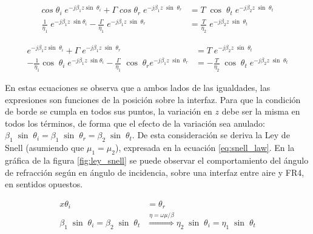 \begin{equation}
	\begin{aligned}
		cos \; \theta_i \; e^{-j \beta_1 z \sin \; \theta_i} + \Gamma \; cos \; \theta_r \; e^{-j \beta_1 z \; \sin\; \theta_r} &= T\; \cos\; \theta_t \; e^{-j \beta_2 z \; \sin\; \theta_t}\\
		\frac{1}{\eta_1} \; e^{-j \beta_1 z \; \sin \theta_i} - \frac{\Gamma}{\eta_1} \; e^{-j \beta_1 z \; \sin \; \theta_r} &= \frac{T}{\eta_2} \; e^{-j \beta_2 z \; \sin\; \theta_t}
	\end{aligned}
	\label{eq:continuidad_campos_paralelo}
\end{equation}

\begin{equation}
	\begin{aligned}
		e^{-j \beta_1 z \sin \; \theta_i} + \Gamma \; e^{-j \beta_1 z \; \sin\; \theta_r} &= T\; e^{-j \beta_2 z \; \sin\; \theta_t}\\
		-\frac{1}{\eta_1} \cos\; \theta_i \; e^{-j \beta_1 z \; \sin \theta_i} - \frac{\Gamma}{\eta_1} \; \cos\; \theta_r e^{-j \beta_1 z \; \sin \; \theta_r} &= -\frac{T}{\eta_2} \; \cos\; \theta_t \; e^{-j \beta_2 z \; \sin\; \theta_t}
	\end{aligned}
	\label{eq:continuidad_campos_perpendicular}
\end{equation}

En estas ecuaciones se observa que a ambos lados de las igualdades, las expresiones son funciones de la posición sobre la interfaz. Para que la condición de borde se cumpla en todos sus puntos, la variación en $z$ debe ser la misma en todos los términos, de forma que el efecto de la variación sea anulado: $\beta_1 \; \sin\; \theta_i = \beta_1 \; \sin \; \theta_r = \beta_2 \; \sin\; \theta_t$.  De esta consideración se deriva la Ley de Snell (asumiendo que $\mu_1 = \mu_2$), expresada en la ecuación \ref{eq:snell_law}. En la gráfica de la figura \ref{fig:ley_snell} se puede observar el comportamiento del ángulo de refracción según en ángulo de incidencia, sobre una interfaz entre aire y FR4, en sentidos opuestos.

\begin{subequations}
	\label{eq:snell_law}
	\begin{align}x
	\theta_i &= \theta_r\\
	\beta_1 \; \sin\; \theta_i = \beta_2 \; \sin\; \theta_t & \overset{\eta=\omega\mu/\beta}{\Longrightarrow} \eta_2 \; \sin\; \theta_i = \eta_1 \; \sin\; \theta_t  \label{eq:snell_law_second}
	\end{align}
\end{subequations}

